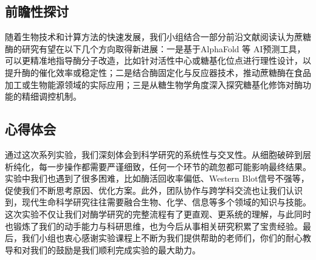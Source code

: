 \documentclass[10.5pt, a4paper]{ctexart}
\begin{document}
\subsection{前瞻性探讨}
随着生物技术和计算方法的快速发展，我们小组结合一部分前沿文献阅读认为蔗糖酶的研究有望在以下几个方向取得新进展：一是基于AlphaFold 等 AI预测工具，可以更精准地指导酶分子改造，比如针对活性中心或糖基化位点进行理性设计，以提升酶的催化效率或稳定性；二是结合酶固定化与反应器技术，推动蔗糖酶在食品加工或生物能源领域的实际应用；三是从糖生物学角度深入探究糖基化修饰对酶功能的精细调控机制。

\subsection{心得体会}
通过这次系列实验，我们深刻体会到科学研究的系统性与交叉性。从细胞破碎到层析纯化，每一步操作都需要严谨细致，任何一个环节的疏忽都可能影响最终结果。实验中我们也遇到了很多困难，比如酶活回收率偏低、Western Blot信号不强等，促使我们不断思考原因、优化方案。此外，团队协作与跨学科交流也让我们认识到，现代生命科学研究往往需要融合生物、化学、信息等多个领域的知识与技能。这次实验不仅让我们对酶学研究的完整流程有了更直观、更系统的理解，与此同时也锻炼了我们的动手能力与科研思维，也为今后从事相关研究积累了宝贵经验。最后，我们小组也衷心感谢实验课程上不断为我们提供帮助的老师们，你们的耐心教导和对我们的鼓励是我们顺利完成实验的最大助力。
\end{document}
